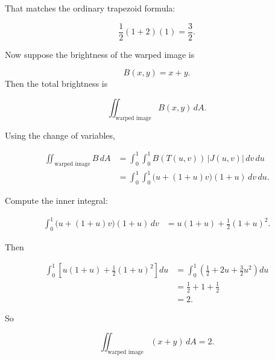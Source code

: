 That matches the ordinary trapezoid formula:

\[
    \frac12(1+2)(1)=\frac32.
\]

Now suppose the brightness of the warped image is

\[
    B(x,y)=x+y.
\]
Then the total brightness is

\[
    \iint_{\text{warped image}} B(x,y)\,dA.
\]

Using the change of variables,

\[
\begin{aligned}
\iint_{\text{warped image}} B\,dA
&=
\int_0^1\int_0^1
B(T(u,v))\,|J(u,v)|\,dv\,du\\
&=
\int_0^1\int_0^1
\bigl(u+(1+u)v\bigr)(1+u)\,dv\,du.
\end{aligned}
\]

Compute the inner integral:

\[
\begin{aligned}
\int_0^1
\bigl(u+(1+u)v\bigr)(1+u)\,dv
&=
u(1+u)+\frac12(1+u)^2.
\end{aligned}
\]

Then

\[
\begin{aligned}
\int_0^1
\left[
u(1+u)+\frac12(1+u)^2
\right]du
&=
\int_0^1
\left(
\frac12+2u+\frac32u^2
\right)du\\
&=
\frac12+1+\frac12\\
&=
2.
\end{aligned}
\]

So

\[
\boxed{
    \iint_{\text{warped image}}(x+y)\,dA=2.
}
\]

